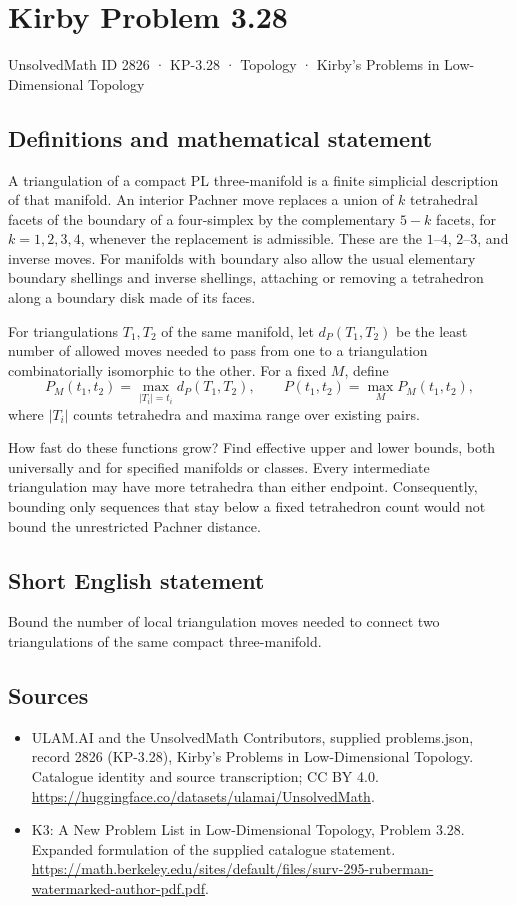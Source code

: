\documentclass[11pt,a4paper]{article}
\begin{document}
\section*{Kirby Problem 3.28}\label{2826}
{\small UnsolvedMath ID 2826 · KP-3.28 · Topology · Kirby's Problems in Low-Dimensional Topology}
\subsection{Definitions and mathematical statement}
A triangulation of a compact PL three-manifold is a finite simplicial
description of that manifold. An interior Pachner move replaces a union
of $k$ tetrahedral facets of the boundary of a four-simplex by the
complementary $5-k$ facets, for $k=1,2,3,4$, whenever the replacement is
admissible. These are the $1$--$4$, $2$--$3$, and inverse moves.
For manifolds with boundary also allow the usual elementary boundary
shellings and inverse shellings, attaching or removing a tetrahedron along
a boundary disk made of its faces.

For triangulations $T_1,T_2$ of the same manifold, let $d_P(T_1,T_2)$ be
the least number of allowed moves needed to pass from one to a triangulation
combinatorially isomorphic to the other. For a fixed $M$, define
\[
 P_M(t_1,t_2)=\max_{|T_i|=t_i}d_P(T_1,T_2),\qquad
 P(t_1,t_2)=\max_M P_M(t_1,t_2),
\]
where $|T_i|$ counts tetrahedra and maxima range over existing pairs.

How fast do these functions grow? Find effective upper and lower bounds,
both universally and for specified manifolds or classes. Every intermediate
triangulation may have more tetrahedra than either endpoint. Consequently,
bounding only sequences that stay below a fixed tetrahedron count would
not bound the unrestricted Pachner distance.
\subsection{Short English statement}
Bound the number of local triangulation moves needed to connect two triangulations of the same compact three-manifold.
\subsection{Sources}
\begin{itemize}
\item[S1] ULAM.AI and the UnsolvedMath Contributors, supplied problems.json, record 2826 (KP-3.28), Kirby's Problems in Low-Dimensional Topology. Catalogue identity and source transcription; CC BY 4.0.
\url{https://huggingface.co/datasets/ulamai/UnsolvedMath}.
\item[S2] K3: A New Problem List in Low-Dimensional Topology, Problem 3.28. Expanded formulation of the supplied catalogue statement.
\url{https://math.berkeley.edu/sites/default/files/surv-295-ruberman-watermarked-author-pdf.pdf}.
\end{itemize}
\end{document}
